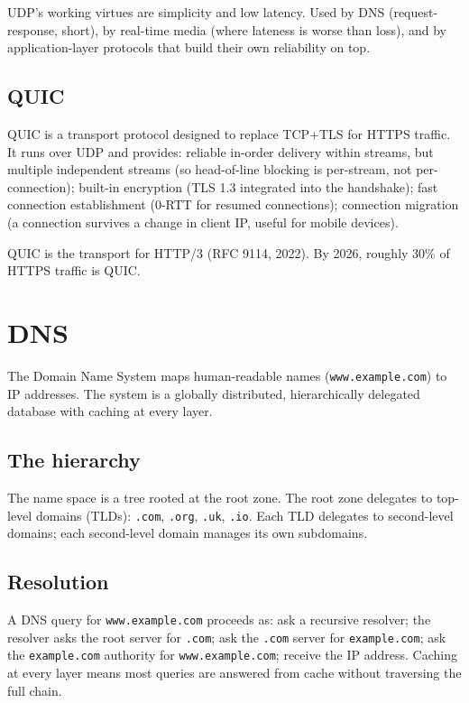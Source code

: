 UDP's working virtues are simplicity and low latency. Used by DNS (request-response, short), by real-time media (where lateness is worse than loss), and by application-layer protocols that build their own reliability on top.

\subsection{QUIC}

QUIC is a transport protocol designed to replace TCP+TLS for HTTPS traffic. It runs over UDP and provides: reliable in-order delivery within streams, but multiple independent streams (so head-of-line blocking is per-stream, not per-connection); built-in encryption (TLS 1.3 integrated into the handshake); fast connection establishment ($0$-RTT for resumed connections); connection migration (a connection survives a change in client IP, useful for mobile devices).

QUIC is the transport for HTTP/3 (RFC 9114, 2022). By 2026, roughly $30\%$ of HTTPS traffic is QUIC.

\section{DNS}

The Domain Name System maps human-readable names (\texttt{www.example.com}) to IP addresses. The system is a globally distributed, hierarchically delegated database with caching at every layer.

\subsection{The hierarchy}

The name space is a tree rooted at the root zone. The root zone delegates to top-level domains (TLDs): \texttt{.com}, \texttt{.org}, \texttt{.uk}, \texttt{.io}. Each TLD delegates to second-level domains; each second-level domain manages its own subdomains.

\subsection{Resolution}

A DNS query for \texttt{www.example.com} proceeds as: ask a recursive resolver; the resolver asks the root server for \texttt{.com}; ask the \texttt{.com} server for \texttt{example.com}; ask the \texttt{example.com} authority for \texttt{www.example.com}; receive the IP address. Caching at every layer means most queries are answered from cache without traversing the full chain.

